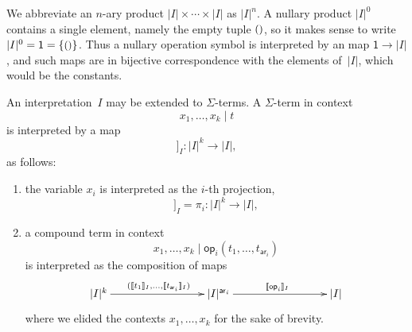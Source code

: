 \documentclass{amsart}
\newcommand{\carrier}[1]{|#1|} %
\newcommand{\set}[1]{\{#1\}} %
\newcommand{\op}[1]{\mathsf{op}_{#1}} %
\newcommand{\arity}[1]{\mathsf{ar}_{#1}} %
\newcommand{\one}{\mathsf{1}} %
\newcommand{\unit}{{\text{\small$()$}}} %
\newcommand{\sem}[1]{[\![#1]\!]} %
\begin{document}
We abbreviate an $n$-ary product $\carrier{I} \times \cdots \times \carrier{I}$ as $\carrier{I}^n$. A
nullary product $\carrier{I}^0$ contains a single element, namely the empty tuple
$\unit$, so it makes sense to write $\carrier{I}^0 = \one = \set{\unit}$. Thus a nullary
operation symbol is interpreted by an map $\one \to \carrier{I}$, and such maps are in
bijective correspondence with the elements of~$\carrier{I}$, which would be the constants.

An interpretation~$I$ may be extended to $\Sigma$-terms. A $\Sigma$-term in context
%
\begin{equation*}
  x_1, \ldots, x_k \mid t
\end{equation*}
%
is interpreted by a map
%
\begin{equation*}
  \sem{x_1, \ldots, x_k \mid t}_I : \carrier{I}^k \to \carrier{I},
\end{equation*}
%
as follows:
%
\begin{enumerate}
\item the variable $x_i$ is interpreted as the $i$-th projection,
  \begin{equation*}
    \sem{x_1, \ldots, x_k \mid  x_i}_I = \pi_i : \carrier{I}^k \to \carrier{I},
  \end{equation*}
\item a compound term in context
  \begin{equation*}
    x_1, \ldots, x_k \mid \op{i}(t_1, \ldots, t_{\arity{i}})
  \end{equation*}
  is interpreted as the composition of maps
  \begin{equation*}
    \xymatrix@+6em{
      {\carrier{I}^k} \ar[r]^{(\sem{t_1}_I, \ldots, \sem{t_{\arity{i}}}_I)}
      &
      {\carrier{I}^{\arity{i}}} \ar[r]^{\sem{\op{i}}_I}
      &
      {\carrier{I}}
    }
  \end{equation*}
  where we elided the contexts $x_1, \ldots, x_k$ for the sake of brevity.
\end{enumerate}
\end{document}
